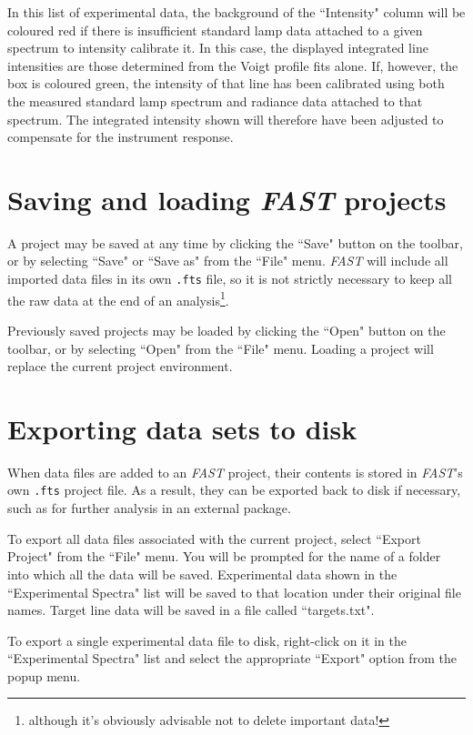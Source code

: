 \documentclass[a4paper,12pt]{report}
\newcommand{\fast}{\emph{FAST} }
\begin{document}
In this list of experimental data, the background of the ``Intensity" column will be coloured \colorbox{int_not_calibrated}{red} if there is insufficient standard lamp data attached to a given spectrum to intensity calibrate it. In this case, the displayed integrated line intensities are those determined from the Voigt profile fits alone. If, however, the box is coloured \colorbox{int_calibrated}{green}, the intensity of that line has been calibrated using both the measured standard lamp spectrum and radiance data attached to that spectrum. The integrated intensity shown will therefore have been adjusted to compensate for the instrument response.

\section{Saving and loading \fast projects}
A project may be saved at any time by clicking the ``Save" button on the toolbar, or by selecting ``Save" or ``Save as" from the ``File" menu. \fast will include all imported data files in its own \verb|.fts| file, so it is not strictly necessary to keep all the raw data at the end of an analysis\footnote{although it's obviously advisable not to delete important data!}.

Previously saved projects may be loaded by clicking the ``Open" button on the toolbar, or by selecting ``Open" from the ``File" menu. Loading a project will replace the current project environment.

\section{Exporting data sets to disk}
When data files are added to an \fast project, their contents is stored in \emph{FAST}'s own \verb|.fts| project file. As a result, they can be exported back to disk if necessary, such as for further analysis in an external package.

To export all data files associated with the current project, select ``Export Project" from the ``File" menu. You will be prompted for the name of a folder into which all the data will be saved. Experimental data shown in the ``Experimental Spectra" list will be saved to that location under their original file names. Target line data will be saved in a file called ``targets.txt".

To export a single experimental data file to disk, right-click on it in the ``Experimental Spectra" list and select the appropriate ``Export" option from the popup menu.
\end{document}
